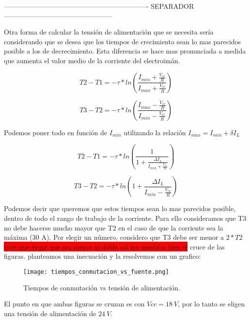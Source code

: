 ----------------------------------------------------------------
SEPARADOR
------------------------------------------------


Otra forma de calcular la tensión de alimentación que se necesita sería considerando que se desea que los tiempos de crecimiento sean lo mas parecidos posible a los de decrecimiento. Esta diferencia se hace mas pronunciada a medida que aumenta el valor medio de la corriente del electroimán.

\begin{equation}
	T2-T1=-\tau*ln(\frac{I_{min}+\frac{V_{cc}}{R}}{I_{max}+\frac{V_{cc}}{R}})
\end{equation}

\begin{equation}
	T3-T2=-\tau*ln(\frac{I_{max}-\frac{V_{cc}}{R}}{I_{min}-\frac{V_{cc}}{R}})
\end{equation}


Podemos poner todo en función de $I_{min}$ utilizando la relación $I_{max}=I_{min}+\delta I_L$

\begin{equation}
	T2-T1=-\tau*ln(\frac{1}{1+\frac{\Delta I_L}{I_{min}+\frac{V_{cc}}{R}}})
\end{equation}

\begin{equation}
	T3-T2=-\tau*ln(1+\frac{\Delta I_L}{I_{min}-\frac{V_{cc}}{R}})
\end{equation}


Podemos decir que queremos que estos tiempos sean lo mas parecidos posible, dentro de todo el rango de trabajo de la corriente. Para ello consideramos que T3 no debe hacerse mucho mayor que T2 en el caso de que la corriente sea la máxima (30 A). Por elegir un número, considero que T3 debe ser menor a $2*T2$ \colorbox{red}{tuve que elegir que sea menor al doble así me quedaba bien el} cruce de las figuras.  planteamos una inecuación y la resolvemos con un grafico:

\begin{figure}[H]
	\centering
	\texttt{[image: tiempos\_conmutacion\_vs\_fuente.png]}
	\caption{Tiempos de conmutación vs tensión de alimentación.}
	\label{fig:img_tiempos_conmutacion}
\end{figure}

El punto en que ambas figuras se cruzan es con $Vcc=18\:V$, por lo tanto se eligen una tensión de alimentación de $24\:V$.

 